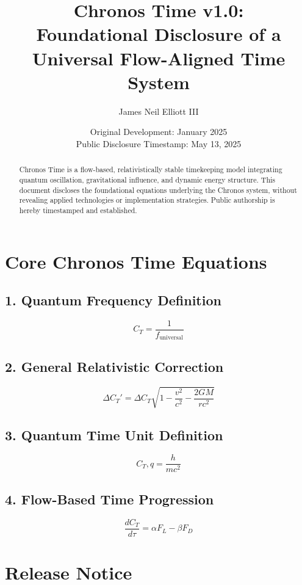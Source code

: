 \documentclass[11pt]{article}
\title{\textbf{Chronos Time v1.0:\\ Foundational Disclosure of a Universal Flow-Aligned Time System}}
\author{James Neil Elliott III}
\date{Original Development: January 2025\\Public Disclosure Timestamp: May 13, 2025}
\begin{document}
\maketitle

\begin{abstract}
Chronos Time is a flow-based, relativistically stable timekeeping model integrating quantum oscillation, gravitational influence, and dynamic energy structure. This document discloses the foundational equations underlying the Chronos system, without revealing applied technologies or implementation strategies. Public authorship is hereby timestamped and established.
\end{abstract}

\section*{Core Chronos Time Equations}

\subsection*{1. Quantum Frequency Definition}
\begin{equation}
C_T = \frac{1}{f_{\text{universal}}}
\end{equation}

\subsection*{2. General Relativistic Correction}
\begin{equation}
\Delta C_T' = \Delta C_T \sqrt{1 - \frac{v^2}{c^2} - \frac{2GM}{rc^2}}
\end{equation}

\subsection*{3. Quantum Time Unit Definition}
\begin{equation}
C_T,q = \frac{h}{mc^2}
\end{equation}

\subsection*{4. Flow-Based Time Progression}
\begin{equation}
\frac{dC_T}{d\tau} = \alpha F_L - \beta F_D
\end{equation}

\section*{Release Notice}
\end{document}
